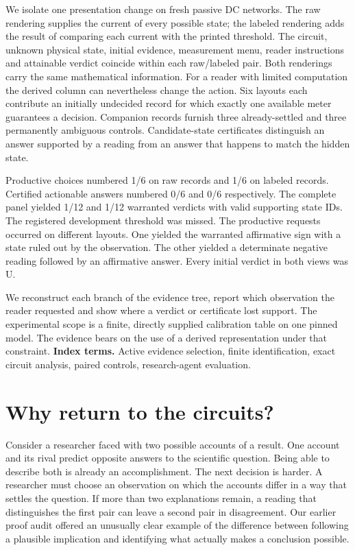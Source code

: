 \documentclass[12pt,letterpaper]{article}
\begin{document}
We isolate one presentation change on fresh passive DC networks. The raw rendering supplies the current of every possible state; the labeled rendering adds the result of comparing each current with the printed threshold. The circuit, unknown physical state, initial evidence, measurement menu, reader instructions and attainable verdict coincide within each raw/labeled pair. Both renderings carry the same mathematical information. For a reader with limited computation the derived column can nevertheless change the action. Six layouts each contribute an initially undecided record for which exactly one available meter guarantees a decision. Companion records furnish three already-settled and three permanently ambiguous controls. Candidate-state certificates distinguish an answer supported by a reading from an answer that happens to match the hidden state.

Productive choices numbered 1/6 on raw records and 1/6 on labeled records. Certified actionable answers numbered 0/6 and 0/6 respectively. The complete panel yielded 1/12 and 1/12 warranted verdicts with valid supporting state IDs. The registered development threshold was missed. The productive requests occurred on different layouts. One yielded the warranted affirmative sign with a state ruled out by the observation. The other yielded a determinate negative reading followed by an affirmative answer. Every initial verdict in both views was U.

We reconstruct each branch of the evidence tree, report which observation the reader requested and show where a verdict or certificate lost support. The experimental scope is a finite, directly supplied calibration table on one pinned model. The evidence bears on the use of a derived representation under that constraint.
\vfill\noindent\small\textbf{Index terms.} Active evidence selection, finite identification, exact circuit analysis, paired controls, research-agent evaluation.
\clearpage\tableofcontents\clearpage{}


\section{Why return to the circuits?}

Consider a researcher faced with two possible accounts of a result. One account and its rival predict opposite answers to the scientific question. Being able to describe both is already an accomplishment. The next decision is harder. A researcher must choose an observation on which the accounts differ in a way that settles the question. If more than two explanations remain, a reading that distinguishes the first pair can leave a second pair in disagreement. Our earlier proof audit offered an unusually clear example of the difference between following a plausible implication and identifying what actually makes a conclusion possible.
\end{document}
